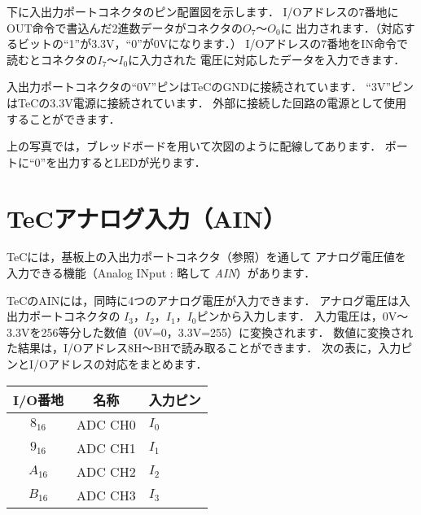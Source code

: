 下に入出力ポートコネクタのピン配置図を示します．
I/Oアドレスの7番地にOUT命令で書込んだ2進数データがコネクタの$O_7$〜$O_0$に
出力されます．（対応するビットの``1''が3.3V，``0''が0Vになります．）
I/Oアドレスの7番地をIN命令で読むとコネクタの$I_7$〜$I_0$に入力された
電圧に対応したデータを入力できます．

入出力ポートコネクタの``0V''ピンはTeCのGNDに接続されています．
``3V''ピンはTeCの3.3V電源に接続されています．
外部に接続した回路の電源として使用することができます．

\begin{center}
\end{center}

上の写真では，ブレッドボードを用いて次図のように配線してあります．
ポートに``0''を出力するとLEDが光ります．

\begin{center}
\end{center}

\newpage
\section{TeCアナログ入力（AIN）}
\label{ain}

TeCには，基板上の入出力ポートコネクタ（参照）を通して
アナログ電圧値を入力できる機能（Analog INput : 略して \emph{AIN}）があります．

TeCのAINには，同時に4つのアナログ電圧が入力できます．
アナログ電圧は入出力ポートコネクタの
$I_3$，$I_2$，$I_1$，$I_0$ピンから入力します．
入力電圧は，0V〜3.3Vを256等分した数値（0V=0，3.3V=255）に変換されます．
数値に変換された結果は，I/Oアドレス8H〜BHで読み取ることができます．
次の表に，入力ピンとI/Oアドレスの対応をまとめます．

{\footnotesize\begin{center}
  \begin{tabular}{c|l|l}
    \hline
    \hline
    I/O番地 & \multicolumn{1}{|c|}{名称} & \multicolumn{1}{|c}{入力ピン} \\
    \hline
    $8_{16}$ & ADC CH0  & $I_0$ \\
    $9_{16}$ & ADC CH1  & $I_1$ \\
    $A_{16}$ & ADC CH2  & $I_2$ \\
    $B_{16}$ & ADC CH3  & $I_3$ \\
  \end{tabular}
\end{center}}

